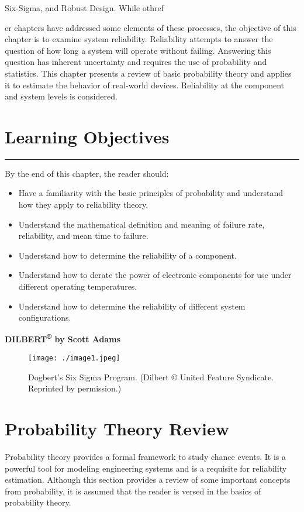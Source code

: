 Six-Sigma, and Robust Design. While othref{er chapters have addressed some
elements of these processes, the objective of this chapter is to examine
system reliability. Reliability attempts to answer the question of how
long a system will operate without failing. Answering this question has
inherent uncertainty and requires the use of probability and statistics.
This chapter presents a review of basic probability theory and applies
it to estimate the behavior of real-world devices. Reliability at the
component and system levels is considered.

\section*{Learning Objectives}
\noindent\rule{\linewidth}{1pt}
By the end of this chapter, the reader should:


\begin{itemize}
\item
  Have a familiarity with the basic principles of probability and
  understand how they apply to reliability theory.
\item
  Understand the mathematical definition and meaning of failure rate,
  reliability, and mean time to failure.
\item
  Understand how to determine the reliability of a component.
\item
  Understand how to derate the power of electronic components for use
  under different operating temperatures.
\item
  Understand how to determine the reliability of different system
  configurations.
\end{itemize}

\textbf{\hfill\break
DILBERT\textsuperscript{®} by Scott Adams}

\begin{figure}
\texttt{[image: ./image1.jpeg]}
\caption{Dogbert's Six Sigma Program. (Dilbert © United Feature Syndicate. Reprinted by
permission.)}
\label{figure:dilbert6sigma}
\end{figure}


\section{Probability Theory Review}
\label{section:probability-theory-review}

Probability theory provides a formal framework to study chance events.
It is a powerful tool for modeling engineering systems and is a
requisite for reliability estimation. Although this section provides a
review of some important concepts from probability, it is assumed that
the reader is versed in the basics of probability theory.

}
